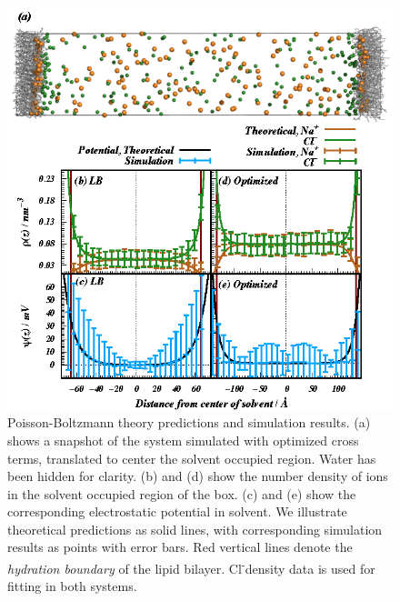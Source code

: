 \documentclass[journal=langd5,manuscript=article]{achemso}
\newcommand{\cl}{Cl\textsuperscript{-}}
\begin{document}
\clearpage
\begin{figure}
    \caption{ Poisson-Boltzmann theory predictions and simulation results. (a) shows a snapshot of the 
system simulated with optimized cross terms, translated
to center the solvent occupied region. Water has been hidden
for clarity. (b) and (d)
    show the number density of ions in the solvent occupied region of the box. 
    (c) and (e) show the corresponding electrostatic potential in solvent.
    We illustrate theoretical predictions as solid lines, with corresponding 
    simulation results as points with error bars. Red vertical lines denote the \emph{hydration boundary} of the lipid bilayer. 
    \cl density data is used for fitting in both systems. 
}
    \label{fig:gouy}
    \includegraphics[width=\textwidth,trim=0 0 0 0]{figure_s4.eps}
\end{figure}
\end{document}
